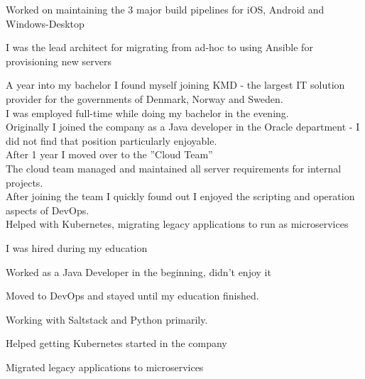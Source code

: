 \documentclass[]{cv}
\begin{document}
\begin{minipage}[t]{0.66\textwidth}
\begin{tightemize}
	\item Worked on maintaining the 3 major build pipelines for iOS, Android and	Windows-Desktop
	\item I was the lead architect for migrating from ad-hoc to using Ansible for provisioning new servers
\end{tightemize}
\sectionsep


A year into my bachelor I found myself joining KMD - the largest IT solution provider for the governments of Denmark, Norway and Sweden. \\
I was employed full-time while doing my bachelor in the evening. \\
Originally I joined the company as a Java developer in the Oracle department - I did not find that position particularly enjoyable. \\
After 1 year I moved over to the ”Cloud Team” \\
The cloud team managed and maintained all server requirements for internal projects. \\
After joining the team I quickly found out I enjoyed the scripting and operation aspects of DevOps. \\
Helped with Kubernetes, migrating legacy applications to run as microservices

\begin{tightemize}
	\item I was hired during my education
	\item Worked as a Java Developer in the beginning, didn’t enjoy it
	\item Moved to DevOps and stayed until my education finished.
	\item Working with Saltstack and Python primarily.
	\item Helped getting Kubernetes started in the company
    \item Migrated legacy applications to microservices
\end{tightemize}
\sectionsep

\end{minipage} 
\end{document}
